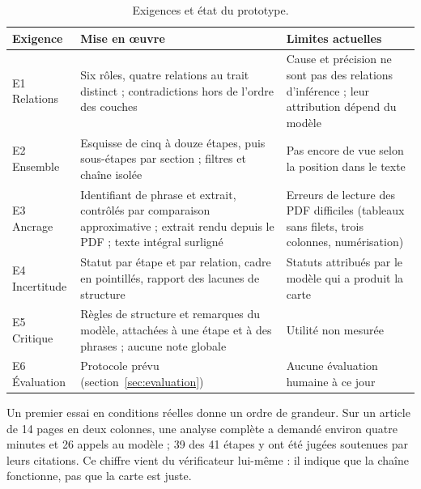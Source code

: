 \begin{table}[ht]
\centering\footnotesize
\caption{Exigences et état du prototype.}
\label{tab:exigences}
\renewcommand{\arraystretch}{1.2}
\begin{tabularx}{\textwidth}{@{}>{\raggedright\arraybackslash}p{2.4cm}LL@{}}
\toprule
Exigence & Mise en œuvre & Limites actuelles \\
\midrule
E1 Relations & Six rôles, quatre relations au trait distinct ; contradictions hors de l’ordre des couches & Cause et précision ne sont pas des relations d’inférence ; leur attribution dépend du modèle \\
E2 Ensemble & Esquisse de cinq à douze étapes, puis sous-étapes par section ; filtres et chaîne isolée & Pas encore de vue selon la position dans le texte \\
E3 Ancrage & Identifiant de phrase et extrait, contrôlés par comparaison approximative ; extrait rendu depuis le PDF ; texte intégral surligné & Erreurs de lecture des PDF difficiles (tableaux sans filets, trois colonnes, numérisation) \\
E4 Incertitude & Statut par étape et par relation, cadre en pointillés, rapport des lacunes de structure & Statuts attribués par le modèle qui a produit la carte \\
E5 Critique & Règles de structure et remarques du modèle, attachées à une étape et à des phrases ; aucune note globale & Utilité non mesurée \\
E6 Évaluation & Protocole prévu (section~\ref{sec:evaluation}) & Aucune évaluation humaine à ce jour \\
\bottomrule
\end{tabularx}
\end{table}

Un premier essai en conditions réelles donne un ordre de grandeur. Sur un article de 14 pages en deux colonnes, une analyse complète a demandé environ quatre minutes et 26 appels au modèle ; 39 des 41 étapes y ont été jugées soutenues par leurs citations. Ce chiffre vient du vérificateur lui-même : il indique que la chaîne fonctionne, pas que la carte est juste.
